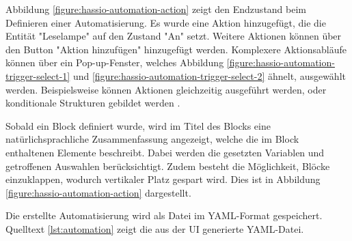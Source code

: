Abbildung \ref{figure:hassio-automation-action} zeigt den Endzustand beim Definieren einer Automatisierung. Es wurde eine Aktion hinzugefügt, die die Entität "Leselampe" auf den Zustand "An" setzt. Weitere Aktionen können über den Button "Aktion hinzufügen" hinzugefügt werden. Komplexere Aktionsabläufe können über ein Pop-up-Fenster, welches Abbildung \ref{figure:hassio-automation-trigger-select-1} und \ref{figure:hassio-automation-trigger-select-2} ähnelt, ausgewählt werden. Beispielsweise können Aktionen gleichzeitig ausgeführt werden, oder konditionale Strukturen gebildet werden \parencite{homeassistantScriptSyntax}.

Sobald ein Block definiert wurde, wird im Titel des Blocks eine natürlichsprachliche Zusammenfassung angezeigt, welche die im Block enthaltenen Elemente beschreibt. Dabei werden die gesetzten Variablen und getroffenen Auswahlen berücksichtigt. Zudem besteht die Möglichkeit, Blöcke einzuklappen, wodurch vertikaler Platz gespart wird. Dies ist in Abbildung \ref{figure:hassio-automation-action} dargestellt.



Die erstellte Automatisierung wird als Datei im \ac{YAML}-Format gespeichert. Quelltext \ref{lst:automation} zeigt die aus der UI generierte \ac{YAML}-Datei. 

